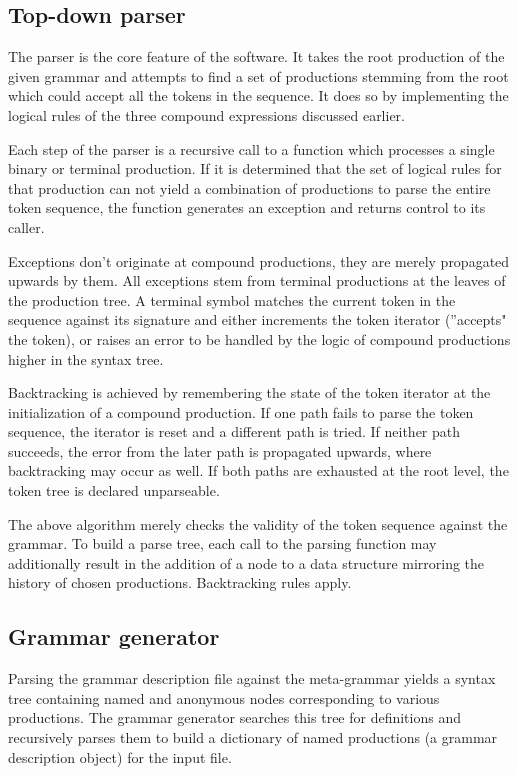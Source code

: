\documentclass{article}
\begin{document}
	\subsection{Top-down parser}

	The parser is the core feature of the software. It takes the root production
	of the given grammar and attempts to find a set of productions stemming from
	the root which could accept all the tokens in the sequence. It does so by
	implementing the logical rules of the three compound expressions discussed
	earlier.

	Each step of the parser is a recursive call to a function which processes
	a single binary or terminal production. If it is determined that the set of
	logical rules for that production can not yield a combination of productions to
	parse the entire token sequence, the function generates an exception and returns
	control to its caller.

	Exceptions don't originate at compound productions, they are merely propagated
	upwards by them. All exceptions stem from terminal productions at the leaves
	of the production tree. A terminal symbol matches the current token in the
	sequence against its signature and either increments the token iterator
	(''accepts" the token), or raises an error to be handled by the logic of
	compound productions higher in the syntax tree.

	Backtracking is achieved by remembering the state of the token iterator at
	the initialization of a compound production. If one path fails to parse
	the token sequence, the iterator is reset and a different path is tried.
	If neither path succeeds, the error from the later path is propagated
	upwards, where backtracking may occur as well. If both paths are exhausted
	at the root level, the token tree is declared unparseable.

	The above algorithm merely checks the validity of the token sequence against
	the grammar. To build a parse tree, each call to the parsing function may
	additionally result in the addition of a node to a data structure mirroring
	the history of chosen productions. Backtracking rules apply.

	\subsection{Grammar generator}

	Parsing the grammar description file against the meta-grammar yields a
	syntax tree containing named and anonymous nodes corresponding to various
	productions. The grammar generator searches this tree for definitions
	and recursively parses them to build a dictionary of named productions
	(a grammar description object) for the input file.
\end{document}
